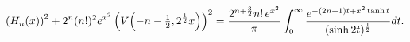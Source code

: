 \[\left(\mathop{H_{n}\/}\nolimits\!\left(x\right)\right)^{2}+2^{n}(n!)^{2}e^{x^{%
2}}\left(\mathop{V\/}\nolimits\!\left(-n-\tfrac{1}{2},2^{\frac{1}{2}}x\right)%
\right)^{2}=\frac{2^{n+\frac{3}{2}}n!\,e^{x^{2}}}{\pi}\int_{0}^{\infty}\frac{e%
^{-(2n+1)t+x^{2}\mathop{\tanh\/}\nolimits t}}{(\mathop{\sinh\/}\nolimits 2t)^{%
\frac{1}{2}}}dt.\]